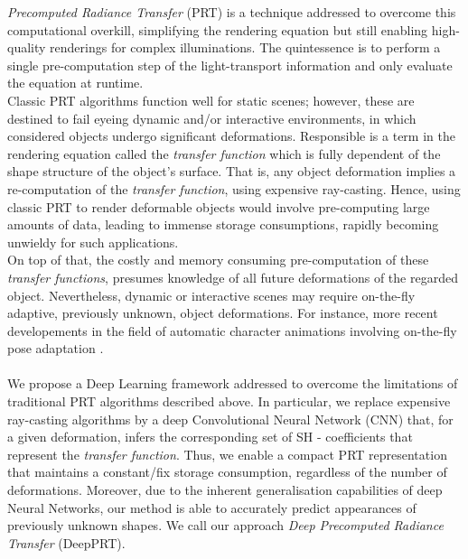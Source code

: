 \textit{Precomputed Radiance Transfer} (PRT) is a technique addressed to overcome this computational overkill, simplifying the rendering equation but still enabling high-quality renderings for complex illuminations. The quintessence is to perform a single pre-computation step of the light-transport information and only evaluate the equation at runtime.\\
Classic PRT algorithms function well for static scenes; however, these are destined to fail eyeing dynamic and/or interactive environments, in which considered objects undergo significant deformations.
Responsible is a term in the rendering equation called the \textit{transfer function} which is fully dependent of the shape structure of the object's surface. That is, any object deformation implies a re-computation of the \textit{transfer function},  using expensive ray-casting. Hence, using classic PRT to render deformable objects would involve pre-computing large amounts of data, leading to immense storage consumptions, rapidly becoming unwieldy for such applications.  \\
On top of that, the costly and memory consuming pre-computation of these \textit{transfer functions}, presumes knowledge of all future deformations of the regarded object. Nevertheless, dynamic or interactive scenes may require on-the-fly adaptive, previously unknown, object deformations. For instance, more recent developements in the field of automatic character animations involving on-the-fly pose adaptation \cite{DeepHuman,Holden2017, QuadrupedMotion}. 
\\
\\
We propose a Deep Learning framework addressed to overcome the limitations of traditional PRT algorithms described above. In particular, we replace expensive ray-casting algorithms by a deep Convolutional Neural Network (CNN) that, for a given deformation, infers the corresponding set of SH - coefficients that represent the \textit{transfer function}. 
Thus, we enable a compact PRT representation that maintains a constant/fix storage consumption, regardless of the number of deformations. Moreover, due to the inherent generalisation capabilities of deep Neural Networks, our method is able to accurately predict appearances of previously unknown shapes. We call our approach \textit{Deep Precomputed Radiance Transfer} (DeepPRT). \\
